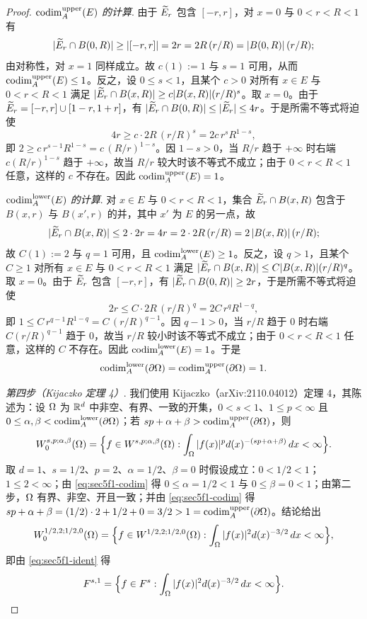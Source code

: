 \begin{proof}
\emph{$\operatorname{codim}_{A}^{\mathrm{upper}}(E)$ 的计算}. 由于 $\widetilde E_r$ 包含 $[-r,r]$，对 $x=0$ 与 $0<r<R<1$ 有
\[
  |\widetilde E_r\cap B(0,R)|\ge|[-r,r]|=2r=2R\,(r/R)=|B(0,R)|\,(r/R);
\]
由对称性，对 $x=1$ 同样成立。故 $c(1):=1$ 与 $s=1$ 可用，从而 $\operatorname{codim}_{A}^{\mathrm{upper}}(E)\le1$。反之，设 $0\le s<1$，且某个 $c>0$ 对所有 $x\in E$ 与 $0<r<R<1$ 满足 $|\widetilde E_r\cap B(x,R)|\ge c|B(x,R)|(r/R)^s$。取 $x=0$。由于 $\widetilde E_r=[-r,r]\cup[1-r,1+r]$，有 $|\widetilde E_r\cap B(0,R)|\le|\widetilde E_r|\le4r$。于是所需不等式将迫使
\[
  4r\ge c\cdot2R\,(r/R)^s=2c\,r^sR^{1-s},
\]
即 $2\ge c\,r^{s-1}R^{1-s}=c\,(R/r)^{1-s}$。因 $1-s>0$，当 $R/r$ 趋于 $+\infty$ 时右端 $c(R/r)^{1-s}$ 趋于 $+\infty$，故当 $R/r$ 较大时该不等式不成立；由于 $0<r<R<1$ 任意，这样的 $c$ 不存在。因此 $\operatorname{codim}_{A}^{\mathrm{upper}}(E)=1$。

\emph{$\operatorname{codim}_{A}^{\mathrm{lower}}(E)$ 的计算}. 对 $x\in E$ 与 $0<r<R<1$，集合 $\widetilde E_r\cap B(x,R)$ 包含于 $B(x,r)$ 与 $B(x',r)$ 的并，其中 $x'$ 为 $E$ 的另一点，故
\[
  |\widetilde E_r\cap B(x,R)|\le2\cdot2r=4r=2\cdot2R\,(r/R)=2\,|B(x,R)|\,(r/R);
\]
故 $C(1):=2$ 与 $q=1$ 可用，且 $\operatorname{codim}_{A}^{\mathrm{lower}}(E)\ge1$。反之，设 $q>1$，且某个 $C\ge1$ 对所有 $x\in E$ 与 $0<r<R<1$ 满足 $|\widetilde E_r\cap B(x,R)|\le C|B(x,R)|(r/R)^q$。取 $x=0$。由于 $\widetilde E_r$ 包含 $[-r,r]$，有 $|\widetilde E_r\cap B(0,R)|\ge2r$，于是所需不等式将迫使
\[
  2r\le C\cdot2R\,(r/R)^q=2C\,r^qR^{1-q},
\]
即 $1\le C\,r^{q-1}R^{1-q}=C\,(r/R)^{q-1}$。因 $q-1>0$，当 $r/R$ 趋于 $0$ 时右端 $C(r/R)^{q-1}$ 趋于 $0$，故当 $r/R$ 较小时该不等式不成立；由于 $0<r<R<1$ 任意，这样的 $C$ 不存在。因此 $\operatorname{codim}_{A}^{\mathrm{lower}}(E)=1$。于是
\begin{equation}\label{eq:sec5f1-codim}
  \operatorname{codim}_{A}^{\mathrm{lower}}(\partial\Omega)=\operatorname{codim}_{A}^{\mathrm{upper}}(\partial\Omega)=1.
\end{equation}

\emph{第四步（Kijaczko 定理 4）}. 我们使用 Kijaczko（arXiv:2110.04012）定理 4，其陈述为：设 $\Omega$ 为 $\mathbb{R}^d$ 中非空、有界、一致的开集，$0<s<1$、$1\le p<\infty$ 且 $0\le\alpha,\beta<\operatorname{codim}_{A}^{\mathrm{lower}}(\partial\Omega)$；若 $sp+\alpha+\beta>\operatorname{codim}_{A}^{\mathrm{upper}}(\partial\Omega)$，则
\[
  W_0^{s,p;\alpha,\beta}(\Omega)
  =\Big\{f\in W^{s,p;\alpha,\beta}(\Omega):\int_\Omega|f(x)|^p d(x)^{-(sp+\alpha+\beta)}\,dx<\infty\Big\}.
\]
取 $d=1$、$s=1/2$、$p=2$、$\alpha=1/2$、$\beta=0$ 时假设成立：$0<1/2<1$；$1\le2<\infty$；由 \eqref{eq:sec5f1-codim} 得 $0\le\alpha=1/2<1$ 与 $0\le\beta=0<1$；由第二步，$\Omega$ 有界、非空、开且一致；并由 \eqref{eq:sec5f1-codim} 得 $sp+\alpha+\beta=(1/2)\cdot2+1/2+0=3/2>1=\operatorname{codim}_{A}^{\mathrm{upper}}(\partial\Omega)$。结论给出
\[
  W_0^{1/2,2;1/2,0}(\Omega)=\Big\{f\in W^{1/2,2;1/2,0}(\Omega):\int_\Omega|f(x)|^2d(x)^{-3/2}\,dx<\infty\Big\},
\]
即由 \eqref{eq:sec5f1-ident} 得
\begin{equation}\label{eq:sec5f1-closure}
  F^{s,1}=\Big\{f\in F^s:\int_\Omega|f(x)|^2d(x)^{-3/2}\,dx<\infty\Big\}.
\end{equation}


\end{proof}
